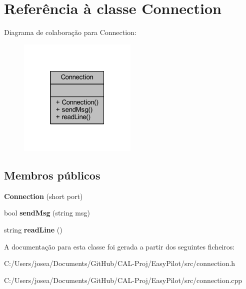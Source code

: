 \hypertarget{class_connection}{}\section{Referência à classe Connection}
\label{class_connection}


Diagrama de colaboração para Connection\+:
\nopagebreak
\begin{figure}[H]
\begin{center}
\leavevmode
\includegraphics[width=160pt]{class_connection__coll__graph}
\end{center}
\end{figure}
\subsection*{Membros públicos}
\begin{DoxyCompactItemize}
\item 
\hypertarget{class_connection_a8089476d48ba545f44e691cd4bd0278d}{}{\bfseries Connection} (short port)\label{class_connection_a8089476d48ba545f44e691cd4bd0278d}

\item 
\hypertarget{class_connection_a4b9f6db1fb42fc9857f829fa0bc52e6e}{}bool {\bfseries send\+Msg} (string msg)\label{class_connection_a4b9f6db1fb42fc9857f829fa0bc52e6e}

\item 
\hypertarget{class_connection_a1df16b436751b686d96c24ca0c498659}{}string {\bfseries read\+Line} ()\label{class_connection_a1df16b436751b686d96c24ca0c498659}

\end{DoxyCompactItemize}


A documentação para esta classe foi gerada a partir dos seguintes ficheiros\+:\begin{DoxyCompactItemize}
\item 
C\+:/\+Users/josea/\+Documents/\+Git\+Hub/\+C\+A\+L-\/\+Proj/\+Easy\+Pilot/src/connection.\+h\item 
C\+:/\+Users/josea/\+Documents/\+Git\+Hub/\+C\+A\+L-\/\+Proj/\+Easy\+Pilot/src/connection.\+cpp\end{DoxyCompactItemize}
